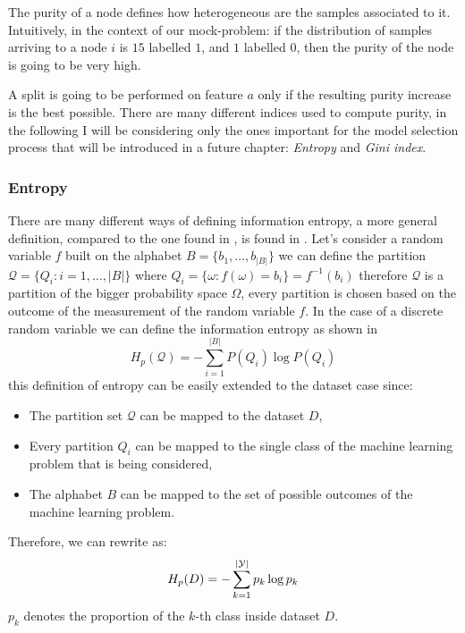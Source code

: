 \medskip

The purity of a node defines how heterogeneous are the samples associated to it. Intuitively, in the
context of our mock-problem: if the distribution of samples arriving to a node $i$ is $15$ labelled
$1$, and $1$ labelled $0$, then the purity of the node is going to be very high.

A split is going to be performed on feature $a$ only if the resulting purity increase is the best
possible. There are many different indices used to compute purity, in the following I will be
considering only the ones important for the model selection process that will be introduced in
a future chapter: \emph{Entropy} and \emph{Gini index}.

\subsubsection{Entropy}
There are many different ways of defining information entropy, a more general definition, compared
to the one found in \cite{ZhouZhi-Hua2021ML}, is found in \cite{gray2011entropy}. Let's consider a
random variable $f$ built on the alphabet $B = \{b_1, \ldots, b_{|B|}\}$ we can define the
partition $\mathcal{Q} = \{Q_i: i = 1, \ldots, |B|\}$ where $Q_i = \{\omega: f(\omega) = b_i\} = f^{-1}(b_i)$ therefore $\mathcal{Q}$ is a partition of the bigger
probability space $\Omega$, every partition is chosen based on the outcome of the
measurement of the random variable $f$. In the case of a discrete random variable we can define the
information entropy as shown in 
\begin{equation}
	\label{eq:information-entropy}
	H_p(\mathcal{Q}) = - \sum_{i = 1}^{|B|}{P(Q_i)\log{P(Q_i)}}
\end{equation}
this definition of entropy can be easily extended to the dataset case since:
\begin{itemize}
	\item The partition set $\mathcal{Q}$ can be mapped to the dataset $D$,
	\item Every partition $Q_i$ can be mapped to the single class of the machine learning
	      problem that is being considered,
	\item The alphabet $B$ can be mapped to the set of possible outcomes of the machine learning
	      problem.
\end{itemize}
Therefore, we can rewrite  as:
\begin{equation}
	H_p(D) = - \sum_{k = 1}^{|\mathcal{Y}|}p_k \log{p_k}
\end{equation}
$p_k$ denotes the proportion of the $k$-th class inside dataset $D$.

